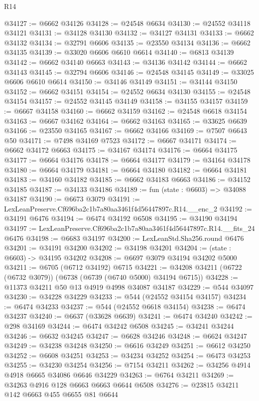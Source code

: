 \begin{lexlean}{R14}
\begin{coremodule}
@34127 := @6662 @34126
@34128 := @24548 @6634
@34130 := @24552 @34118 @34121
@34131 := @34128 @34130
@34132 := @34127 @34131
@34133 := @6662 @34132
@34134 := @32791 @6606
@34135 := @23550 @34134
@34136 := @6662 @34135
@34139 := @33020 @6606 @6610 @6614
@34140 := @6813 @34139
@34142 := @6662 @34140 @6663
@34143 := @34136 @34142
@34144 := @6662 @34143
@34145 := @32794 @6606
@34146 := @24548 @34145
@34149 := @33025 @6606 @6610 @6614
@34150 := @34146 @34149
@34151 := @34144 @34150
@34152 := @6662 @34151
@34154 := @24552 @6634 @34130
@34155 := @24548 @34154
@34157 := @24552 @34145 @34149
@34158 := @34155 @34157
@34159 := @6667 @34158
@34160 := @6662 @34159
@34162 := @24548 @6618 @34154
@34163 := @6667 @34162
@34164 := @6662 @34163
@34165 := @33625 @6639
@34166 := @23550 @34165
@34167 := @6662 @34166
@34169 := @7507 @6643 @50
@34171 := @7498 @34169 @7523
@34172 := @6667 @34171
@34174 := @6662 @34172 @6663
@34175 := @34167 @34174
@34176 := @6664 @34175
@34177 := @6664 @34176
@34178 := @6664 @34177
@34179 := @34164 @34178
@34180 := @6664 @34179
@34181 := @6664 @34180
@34182 := @6664 @34181
@34183 := @34160 @34182
@34185 := @6662 @34183 @6663
@34186 := @34152 @34185
@34187 := @34133 @34186
@34189 := fun (state : @6603) => @34088 @34187
@34190 := @6673 @3079
@34191 := LexLeanPreserve.Cf696ba2c1b7a80aa3461f4d56447897c.R14.__enc_2
@34192 := @34191 @6476
@34194 := @6474 @34192 @6508
@34195 := @34190 @34194
@34197 := LexLeanPreserve.Cf696ba2c1b7a80aa3461f4d56447897c.R14.__fits_24 @6476
@34198 := @6683 @34197
@34200 := LexLeanStd.Sha256.round @6476
@34201 := @34191 @34200
@34202 := @34198 @34201
@34204 := (state : @6603) -> @34195 @34202
@34208 := @6697 @3079 @34194 @34202 @5000
@34211 := @6705 (@6712 @34192) @6715
@34221 := @34208 @34211 (@6722 (@6732 @3079)) (@6738 (@6739 (@6740 @5000) @34194 @6715))
@34228 := @11373 @34211 @50 @13 @4919 @4998 @34087 @34187
@34229 := @544 @34097
@34230 := @34228 @34229
@34233 := @544 (@24552 @34154 @34157)
@34234 := @6474 @34233
@34237 := @544 (@24552 @6618 @34154)
@34238 := @6474 @34237
@34240 := @6637 (@33628 @6639)
@34241 := @6474 @34240
@34242 := @298 @34169
@34244 := @6474 @34242 @6508
@34245 := @34241 @34244
@34246 := @6632 @34245
@34247 := @6628 @34246
@34248 := @6624 @34247
@34249 := @34238 @34248
@34250 := @6616 @34249
@34251 := @6612 @34250
@34252 := @6608 @34251
@34253 := @34234 @34252
@34254 := @6473 @34253
@34255 := @34230 @34254
@34256 := @7154 @34211
@34262 := @34256 @4914 @4918 @6665 @34086 @6646 @34229
@34263 := @6764 @34211
@34269 := @34263 @4916 @128 @6663 @6663 @6644 @6508
@34276 := @23815 @34211 @142 @6663 @455 @6655 @81 @6644

\end{coremodule}
\end{lexlean}
